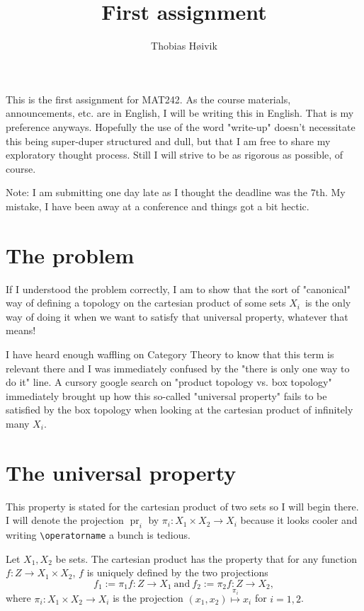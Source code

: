 

\title{\huge{First assignment}}
\author{\LARGE{Thobias Høivik}}
\date{}


\maketitle

This is the first assignment for MAT242. As the 
course materials, announcements, etc. are in English, I 
will be writing this in English. That is my preference anyways. 
Hopefully the use of the word "write-up" doesn't necessitate 
this being super-duper structured and dull, but that I am free 
to share my exploratory thought process. Still I will strive 
to be as rigorous as possible, of course.  

Note: I am submitting one day late as I thought the deadline was 
the $7$th. My mistake, I have been away at a conference 
and things got a bit hectic. 


\section*{The problem}
If I understood the problem correctly, I am to show 
that the sort of "canonical" way of defining a topology 
on the cartesian product of some sets $X_i$ is the only way 
of doing it when we want to satisfy that universal property, 
whatever that means!

I have heard enough waffling on Category Theory to know that 
this term is relevant there and I was immediately confused by 
the "there is only one way to do it" line. A cursory 
google search on "product topology vs. box topology" immediately 
brought up how this so-called "universal property" fails to 
be satisfied by the box topology when looking at the cartesian 
product of infinitely many $X_i$. 

\section*{The universal property}

This property is stated for the cartesian product 
of two sets so I will begin there. 
I will denote the projection $\operatorname{pr}_i$ 
by $\pi_i : X_1 \times X_2 \to X_i$ because it looks cooler and 
writing \verb|\operatorname| a bunch is tedious.

Let $X_1,X_2$ be sets. The cartesian product has the property 
that for any function $f : Z \to X_1 \times X_2$, 
$f$ is uniquely defined by the two projections 
\[
    f_1 := \pi_1 f : Z \to X_1 \ \text{and} \ 
    f_2 := \pi_2 f : Z \to X_2, 
\]
where $\pi_i : X_1 \times X_2 \to X_i$ is the projection 
$(x_1,x_2) \overset{\pi_i}{\mapsto} x_i$ for $i = 1,2$.

